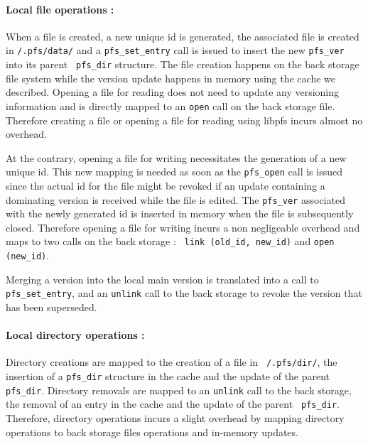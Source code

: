 \paragraph{Local file operations :}
When a file is created, a new unique id is generated, the associated
file is created in {\tt /.pfs/data/} and a {\tt pfs\_set\_entry} call
is issued to insert the new {\tt pfs\_ver} into its parent {\tt
  pfs\_dir} structure. The file creation happens on the back storage
file system while the version update happens in memory using the cache
we described. Opening a file for reading does not need to update any
versioning information and is directly mapped to an {\tt open} call on
the back storage file. Therefore creating a file or opening a file for
reading using libpfs incurs almost no overhead.

At the contrary, opening a file for writing necessitates the
generation of a new unique id. This new mapping is needed as soon as
the {\tt pfs\_open} call is issued since the actual id for the file
might be revoked if an update containing a dominating version is
received while the file is edited. The {\tt pfs\_ver} associated with
the newly generated id is inserted in memory when the file is
subsequently closed. Therefore opening a file for writing incurs a non
negligeable overhead and maps to two calls on the back storage : {\tt
  link (old\_id, new\_id)} and {\tt open (new\_id)}.

Merging a version into the local main version is translated into a
call to {\tt pfs\_set\_entry}, and an {\tt unlink} call to the back
storage to revoke the version that has been superseded.

\paragraph{Local directory operations :}
Directory creations are mapped to the creation of a file in {\tt
  /.pfs/dir/}, the insertion of a {\tt pfs\_dir} structure in the
cache and the update of the parent {\tt pfs\_dir}. Directory removals
are mapped to an {\tt unlink} call to the back storage, the removal of
an entry in the cache and the update of the parent {\tt
  pfs\_dir}. Therefore, directory operations incurs a slight overhead
by mapping directory operations to back storage files operations and
in-memory updates.

\paragraph{}

